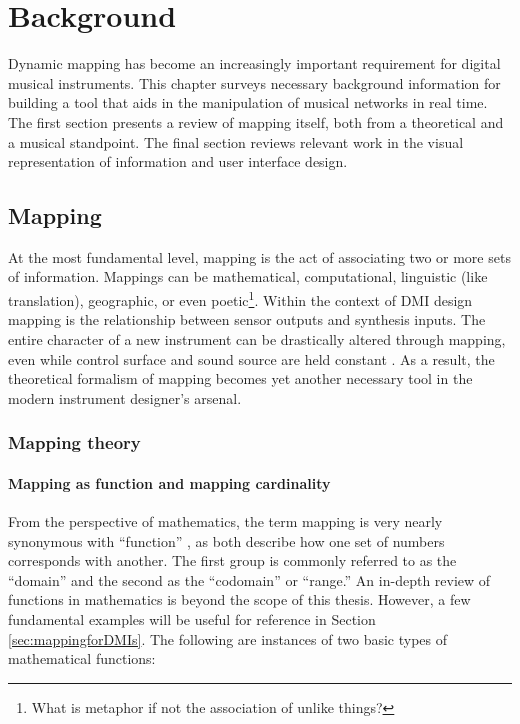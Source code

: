 \chapter{Background}

Dynamic mapping has become an increasingly important requirement for digital musical instruments. This chapter surveys necessary background information for building a tool that aids in the manipulation of musical networks in real time. The first section presents a review of mapping itself, both from a theoretical and a musical standpoint. The final section reviews relevant work in the visual representation of information and user interface design. 

\section{Mapping}

At the most fundamental level, mapping is the act of associating two or more sets of information. Mappings can be mathematical, computational, linguistic (like translation), geographic, or even poetic\footnote{What is metaphor if not the association of unlike things?}. Within the context of DMI design mapping is the relationship between sensor outputs and synthesis inputs. The entire character of a new instrument can be drastically altered through mapping, even while control surface and sound source are held constant . As a result, the theoretical formalism of mapping becomes yet another necessary tool in the modern instrument designer's arsenal.

\subsection{Mapping theory}
	\label{sec:mapping_theory}

	\subsubsection{Mapping as function and mapping cardinality}

From the perspective of mathematics, the term mapping is very nearly synonymous with ``function'' \cite{native_set_theory}, as both describe how one set of numbers corresponds with another. The first group is commonly referred to as the ``domain'' and the second as the ``codomain'' or ``range.'' An in-depth review of functions in mathematics is beyond the scope of this thesis. However, a few fundamental examples will be useful for reference in Section \ref{sec:mappingforDMIs}. The following are instances of two basic types of mathematical functions:

